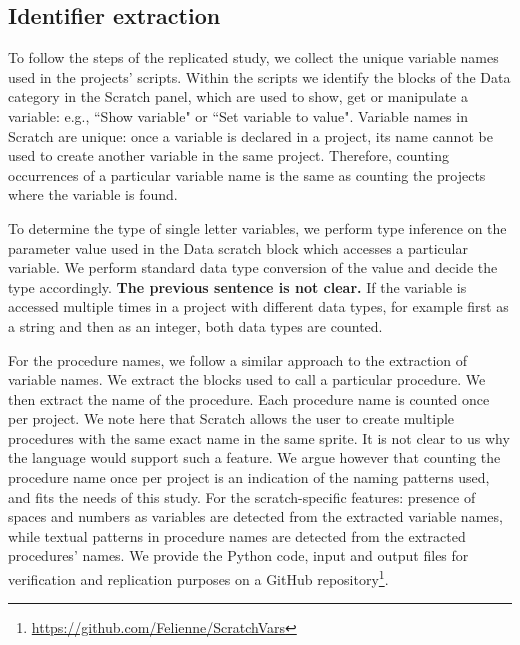 \documentclass[conference]{IEEEtran}
\newcommand{\todo}[1]{ \textbf{#1} }
\begin{document}
\subsection{Identifier extraction}
To follow the steps of the replicated study, we collect the unique variable names used in the projects' scripts. 
Within the scripts we identify the blocks of the Data category in the Scratch panel, which are used to show, get or manipulate a variable: e.g., ``Show variable" or ``Set variable to value". 
Variable names in Scratch are unique: once a variable is declared in a project, its name cannot be used to create another variable in the same project. %
Therefore, counting occurrences of a particular variable name is the same as counting the projects where the variable is found. 

To determine the type of single letter variables, we perform type inference on the parameter value used in the Data scratch block which accesses a particular variable. 
We perform standard data type conversion of the value and decide the type accordingly. \todo{The previous sentence is not clear.}
If the variable is accessed multiple times in a project with different data types, for example first as a string and then as an integer, both data types are counted.

For the procedure names, we follow a similar approach to the extraction of variable names. 
We extract the blocks used to call a particular procedure. 
We then extract the name of the procedure. 
Each procedure name is counted once per project. 
We note here that Scratch allows the user to create multiple procedures with the same exact name in the same sprite. 
It is not clear to us why the language would support such a feature. 
We argue however that counting the procedure name once per project is an indication of the naming patterns used, and fits the needs of this study.  
For the scratch-specific features: presence of spaces and numbers as variables are detected from the extracted variable names, while textual patterns in procedure names are detected from the extracted procedures' names.
We provide the Python code, input and output files for verification and replication purposes on a GitHub repository\footnote{\url{https://github.com/Felienne/ScratchVars}}.
\end{document}
